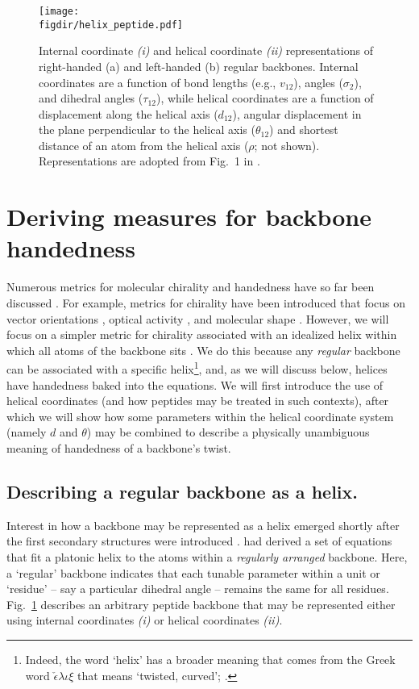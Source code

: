 \documentclass[fleqn,10pt]{wlpeerj} %
\newcommand{\Fig}[1]{Fig.~\ref{#1}}
\newcommand{\figdir}{./figures}
\begin{document}
\begin{figure}[t!]
  \centering
  \texttt{[image: \\figdir/helix\_peptide.pdf]}
  \caption{Internal coordinate \textit{(i)} and helical coordinate \textit{(ii)} representations of right-handed (a) and left-handed (b) regular backbones. Internal coordinates are a function of bond lengths (e.g., $v_{12}$), angles ($\sigma_{2}$), and dihedral angles ($\tau_{12}$), while helical coordinates are a function of displacement along the helical axis ($d_{12}$), angular displacement in the plane perpendicular to the helical axis ($\theta_{12}$) and shortest distance of an  atom from the helical axis ($\rho$; not shown). Representations are adopted from Fig.~1 in \citep{Shimanouchi1955}.
\label{fig:helix}}
\end{figure}

\section*{Deriving measures for backbone handedness}
Numerous metrics for molecular chirality and handedness have so far been discussed \citep{Harris1999}. For example, metrics for chirality have been introduced that focus on vector orientations \citep{Kwiecinska2005,Gruziel2013}, optical activity \citep{Osipov1995}, and molecular shape \citep{Ferrarini1998}. However, we will focus on a simpler metric for chirality associated with an idealized helix within which all atoms of the backbone sits \citep{Shimanouchi1955,Miyazawa1961,Zacharias2013}. We do this because any {\em regular} backbone can be associated with a specific helix\footnote{Indeed, the word `helix' has a broader meaning that comes from the Greek word $\check\epsilon\lambda\iota\xi$ that means `twisted, curved'; \cite{Liddell1894}.}, and, as we will discuss below, helices have handedness baked into the equations. We will first introduce the use of helical coordinates (and how peptides may be treated in such contexts), after which we will show how some parameters within the helical coordinate system (namely $d$ and $\theta$) may be combined to describe a physically unambiguous meaning of handedness of a backbone's twist.

\subsection*{Describing a regular backbone as a helix.} Interest in how a backbone may be represented as a helix emerged shortly after the first secondary structures were introduced \citep{Pauling1951,Pauling1951a,Pauling1951b}. \cite{Shimanouchi1955} had derived a set of equations that fit a platonic helix to the atoms within a {\it regularly arranged} backbone. Here, a `regular' backbone  indicates that each tunable parameter within a unit or `residue' -- say a particular dihedral angle -- remains the same for all residues. \Fig{fig:helix} describes an arbitrary peptide backbone that may be represented either using internal coordinates \textit{(i)} or helical coordinates \textit{(ii)}. 
\end{document}
